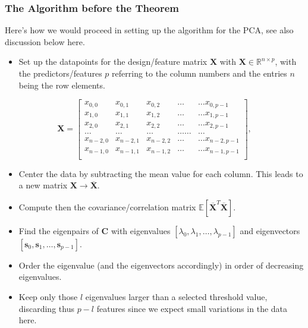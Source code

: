 \documentclass{beamer}
\begin{document}
\begin{frame}
\frametitle{The Algorithm before the Theorem}

Here's how we would proceed in setting up the algorithm for the PCA, see also discussion below here. 
\begin{itemize}
\item Set up the datapoints for the design/feature matrix $\bm{X}$ with $\bm{X}\in {\mathbb{R}}^{n\times p}$, with the predictors/features $p$  referring to the column numbers and the entries $n$ being the row elements.
\end{itemize}

\noindent
\[
\bm{X}=\begin{bmatrix}
x_{0,0} & x_{0,1} & x_{0,2}& \dots & \dots x_{0,p-1}\\
x_{1,0} & x_{1,1} & x_{1,2}& \dots & \dots x_{1,p-1}\\
x_{2,0} & x_{2,1} & x_{2,2}& \dots & \dots x_{2,p-1}\\
\dots & \dots & \dots & \dots \dots & \dots \\
x_{n-2,0} & x_{n-2,1} & x_{n-2,2}& \dots & \dots x_{n-2,p-1}\\
x_{n-1,0} & x_{n-1,1} & x_{n-1,2}& \dots & \dots x_{n-1,p-1}\\
\end{bmatrix},
\]
\begin{itemize}
\item Center the data by subtracting the mean value for each column. This leads to a new matrix $\bm{X}\rightarrow \overline{\bm{X}}$.

\item Compute then the covariance/correlation matrix $\mathbb{E}[\overline{\bm{X}}^T\overline{\bm{X}}]$.

\item Find the eigenpairs of $\bm{C}$ with eigenvalues $[\lambda_0,\lambda_1,\dots,\lambda_{p-1}]$ and eigenvectors $[\bm{s}_0,\bm{s}_1,\dots,\bm{s}_{p-1}]$.

\item Order the eigenvalue (and the eigenvectors accordingly) in order of decreasing eigenvalues.

\item Keep only those $l$ eigenvalues larger than a selected threshold value, discarding thus $p-l$ features since we expect small variations in the data here.
\end{itemize}

\noindent
\end{frame}
\end{document}
